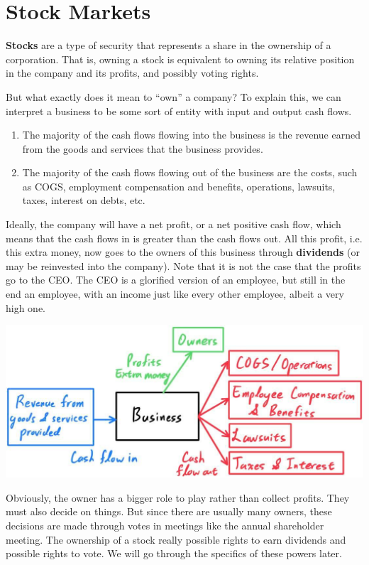 \documentclass{article}
\begin{document}
\section{Stock Markets}

    \begin{definition}[Stocks]
      \textbf{Stocks} are a type of security that represents a share in the ownership of a corporation. That is, owning a stock is equivalent to owning its relative position in the company and its profits, and possibly voting rights. 
    \end{definition}

    But what exactly does it mean to ``own'' a company? To explain this, we can interpret a business to be some sort of entity with input and output cash flows.
    \begin{enumerate}
      \item The majority of the cash flows flowing into the business is the revenue earned from the goods and services that the business provides. 
      \item The majority of the cash flows flowing out of the business are the costs, such as COGS, employment compensation and benefits, operations, lawsuits, taxes, interest on debts, etc.
    \end{enumerate}
    Ideally, the company will have a net profit, or a net positive cash flow, which means that the cash flows in is greater than the cash flows out. All this profit, i.e. this extra money, now goes to the owners of this business through \textbf{dividends} (or may be reinvested into the company). Note that it is not the case that the profits go to the CEO. The CEO is a glorified version of an employee, but still in the end an employee, with an income just like every other employee, albeit a very high one. 
    \begin{center}
      \includegraphics[scale=0.27]{img/Business_Cash_Flow.jpg}
    \end{center}
    Obviously, the owner has a bigger role to play rather than collect profits. They must also decide on things. But since there are usually many owners, these decisions are made through votes in meetings like the annual shareholder meeting. The ownership of a stock really possible rights to earn dividends and possible rights to vote. We will go through the specifics of these powers later. 
\end{document}
